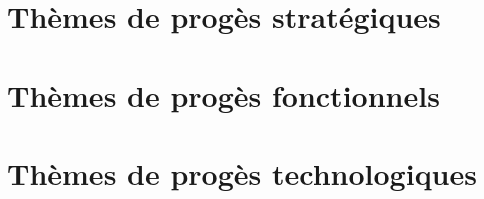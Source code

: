 \section{Thèmes de progès stratégiques}

        
\section{Thèmes de progès fonctionnels}

\section{Thèmes de progès technologiques}


